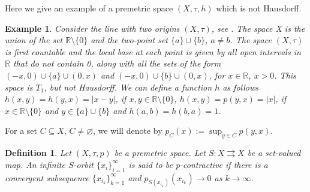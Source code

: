 \documentclass{article}
\renewcommand{\emptyset}{\varnothing}
\newcommand{\R}{\mathbb{R}}
\newtheorem{defi}[theo]{Definition}
\newtheorem{examp}[theo]{Example}
\begin{document}
Here we give an example of a premetric space $(X, \tau, h)$ which is not Hausdorff.
\begin{examp} \label{premetric_T1} Consider the line with two origins $(X, \tau)$, see \cite{Munkres}. The space X is the union of the set $\R \setminus \{0\}$ and the two-point set $\{a\}\cup\{b\}$, $a \neq b$. The space $(X, \tau)$ is first countable and the local base at each point is given by all open intervals in $\R$ that do not contain 0, along with all the sets of the form $(-x,0) \cup \{a\} \cup (0,x)$ and $(-x,0) \cup \{b\} \cup (0,x)$, for $x \in \R$, $x > 0$. This space is $T_1$, but not Hausdorff. We can define a function $h$ as follows $h(x,y)=h(y,x)=|x-y|$, if $x,y \in \R \setminus \{0\}$, $h(x,y)=p(y,x)=|x|$, if $x \in \R \setminus \{0\}$ and $y \in \{a\} \cup \{b\}$ and $h(a,b)=h(b,a)=1$. 
\end{examp}
For a set $C\subseteq X$, $C \neq \emptyset$, we will denote by $p_{C}(x):=\sup_{y\in C} p(y,x)$.

\begin{defi} 
Let $(X, \tau, p)$ be a premetric space. Let $S:X \rightrightarrows X$ be a set-valued map. An infinite $S$-orbit $\{x_i\}_{i=1}^{\infty}$ is said to be p-contractive if there is a convergent subsequence $\{x_{i_k}\}_{k=1}^{\infty}$ and $p_{S(x_{i_k})}(x_{i_k}) \rightarrow 0$ as $k \rightarrow \infty$.
\end{defi}
\end{document}
